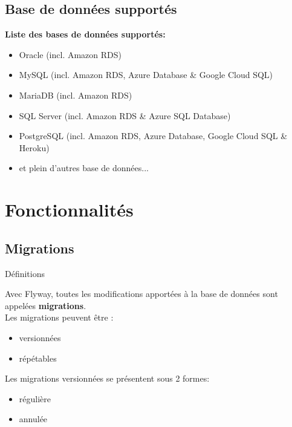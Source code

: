 \documentclass[slidestop,compress,11pt,xcolor=dvipsnames,french]{beamer}
\begin{document}
\subsection*{Base de données supportés}
\begin{frame}
\vspace{1cm}
\textbf {Liste des bases de données supportés: \\}
    \begin{itemize}
        \item Oracle (incl. Amazon RDS)
        \item MySQL (incl. Amazon RDS, Azure Database \& Google Cloud SQL)
        \item MariaDB (incl. Amazon RDS)
        \item SQL Server (incl. Amazon RDS \& Azure SQL Database)
        \item PostgreSQL (incl. Amazon RDS, Azure Database, Google Cloud SQL \& Heroku)
        \item et plein d'autres base de données...
    \end{itemize}
\end{frame}
\section{Fonctionnalités}
\subsection*{Migrations}
\begin{frame}{Définitions}

Avec Flyway, toutes les modifications apportées à la base de données sont appelées \textbf{migrations}. \\
Les migrations peuvent être : 
\begin{itemize}
 \item versionnées
 \item répétables
\end{itemize}

Les migrations versionnées se présentent sous 2 formes:
\begin{itemize}
 \item régulière
 \item annulée
\end{itemize}

\end{frame}
\end{document}
